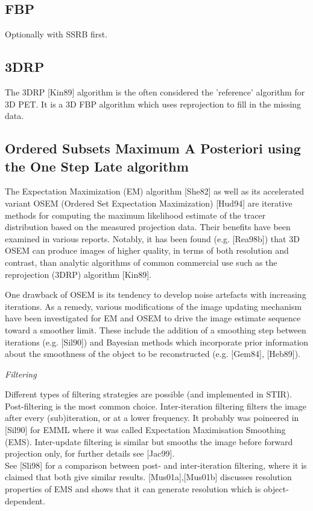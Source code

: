 \documentclass{article}
\begin{document}
\subsection{FBP}
Optionally with SSRB first.

\subsection{3DRP}
The 3DRP [Kin89] algorithm is the often considered the 'reference' 
algorithm for 3D PET. It is a 3D FBP algorithm which uses reprojection 
to fill in the missing data.

\subsection{
Ordered Subsets Maximum A Posteriori using the One Step Late 
algorithm}

The Expectation Maximization (EM) algorithm [She82] as well as 
its accelerated variant OSEM (Ordered Set Expectation Maximization) 
[Hud94] are iterative methods for computing the maximum likelihood 
estimate of the tracer distribution based on the measured projection 
data. Their benefits have been examined in various reports. Notably, 
it has been found (e.g. [Rea98b]) that 3D OSEM can produce images 
of higher quality, in terms of both resolution and contrast, 
than analytic algorithms of common commercial use such as the 
reprojection (3DRP) algorithm [Kin89].

One drawback of OSEM is its tendency to develop noise artefacts 
with increasing iterations. As a remedy, various modifications 
of the image updating mechanism have been investigated for EM 
and OSEM to drive the image estimate sequence toward a smoother 
limit. These include the addition of a smoothing step between 
iterations (e.g. [Sil90]) and Bayesian methods which incorporate 
prior information about the smoothness of the object to be reconstructed 
(e.g. [Gem84], [Heb89]).



\begin{spacing}{1.5}
\textit{Filtering}


\end{spacing}

Different types of filtering strategies are possible (and implemented 
in STIR). Post-filtering is the most common choice. Inter-iteration 
filtering filters the image after every (sub)iteration, or at 
a lower frequency. It probably was poineered in [Sil90] for EMML 
where it was called Expectation Maximisation Smoothing (EMS). 
Inter-update filtering is similar but smooths the image before 
forward projection only, for further details see [Jac99].\\
See [Sli98] for a comparison between post- and inter-iteration 
filtering, where it is claimed that both give similar results. 
[Mus01a],[Mus01b] discusses resolution properties of EMS and 
shows that it can generate resolution which is object-dependent.
\end{document}
